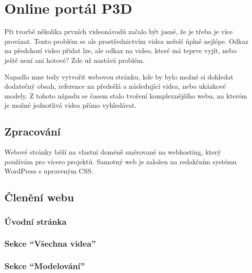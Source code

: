 \chapter{Online portál P3D}
Při tvorbě několika prvních videonávodů začalo být jasné, že je třeba je více provázat.
Tento problém se ale prostřednictvím videa neřeší úplně nejlépe. 
Odkaz na předchozí video přidat lze, ale odkaz na video, které má teprve vyjít, nebo ještě není ani hotové?
Zde už nastává problém.

Napadlo mne tedy vytvořit webovou stránku, kde by bylo možné si dohledat dodatečný obsah, reference na předešlá a následující videa, nebo ukázkové modely.
Z tohoto nápadu se časem stalo tvoření komplexnějšího webu, na kterém je možné jednotlivá videa přímo vyhledávat.

\section{Zpracování}
Webové stránky běží na vlastní doméně směrované na webhosting, který používám pro vícero projektů.
Samotný web je založen na redakčním systému WordPress s upraveným CSS.

\section{Členění webu}
\subsection*{Úvodní stránka}

\subsection*{Sekce \enquote{Všechna videa}}

\subsection*{Sekce \enquote{Modelování}}


\newpage